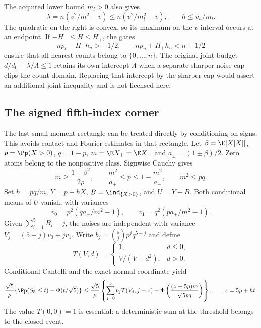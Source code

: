 The acquired lower bound $m_l>0$ also gives
\[
 \lambda=n(v^2/m^2-v)\le n(v^2/m_l^2-v),\qquad h\le v_u/m_l.
\]
The quadratic on the right is convex, so its maximum on the $v$
interval occurs at an endpoint. If $-H_-\le H\le H_+$, the gates
\[
 np_l-H_-h_u>-1/2,\qquad np_u+H_+h_u<n+1/2
\]
ensure that all nearest counts belong to $\{0,\ldots,n\}$.
The original joint budget $d/d_0+\lambda/\Lambda\le1$ retains
its own intercept $\Lambda$ when a separate sharper noise cap clips
the count domain. Replacing that intercept by the sharper cap would
assert an additional joint inequality and is not licensed here.

\subsection{The signed fifth-index corner}
\label{j:finite:gapfree5}
The last small moment rectangle can be treated directly by conditioning
on signs. This avoids contact and Fourier estimates in that rectangle.
Let $\beta=\E[X|X|]$, $p=\Pp(X>0)$, $q=1-p$,
$m=\E X_+=\E X_-$ and $a_\pm=(1\pm\beta)/2$.
Zero atoms belong to the nonpositive class. Signwise Cauchy gives
\[
 m\ge\frac{1+\beta^2}{2\rho},\qquad
 \frac{m^2}{a_+}\le p\le1-\frac{m^2}{a_-},\qquad m^2\le pq.
\]
Set $h=pq/m$, $Y=p+hX$, $B=\ind_{\{X>0\}}$, and $U=Y-B$.
Both conditional means of $U$ vanish, with variances
\[
 v_0=p^2(qa_-/m^2-1),\qquad v_1=q^2(pa_+/m^2-1).
\]
Given $\sum_{i=1}^5B_i=j$, the noises are independent with variance
$V_j=(5-j)v_0+jv_1$. Write $b_j=\binom5j p^jq^{5-j}$ and define
\[
 T(V,d)=\begin{cases}1,&d\le0,\\V/(V+d^2),&d>0.\end{cases}
\]
Conditional Cantelli and the exact normal coordinate yield
\begin{equation}\label{j:finite:gapfree-bound}
 \frac{\sqrt5}{\rho}\{\Pp(S_5\le t)-\Phi(t/\sqrt5)\}
 \le\frac{\sqrt5}{\rho}
 \left\{\sum_{j=0}^5 b_jT(V_j,j-z)
          -\Phi\left(\frac{(z-5p)m}{\sqrt5pq}\right)\right\},
 \qquad z=5p+ht.
\end{equation}
The value $T(0,0)=1$ is essential: a deterministic sum at the threshold
belongs to the closed event.

